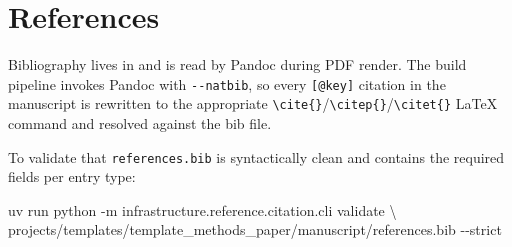 \documentclass[
  english,
]{article}
\newenvironment{Shaded}{}{}
\newcommand{\AttributeTok}[1]{\textcolor[rgb]{0.49,0.56,0.16}{#1}}
\newcommand{\DataTypeTok}[1]{\textcolor[rgb]{0.56,0.13,0.00}{#1}}
\newcommand{\ExtensionTok}[1]{#1}
\newcommand{\NormalTok}[1]{#1}
\begin{document}
\newpage

\section{References}\label{sec:references}

Bibliography lives in
\href{references.bib}{} and is read by
Pandoc during PDF render. The build pipeline invokes Pandoc with
\texttt{-\/-natbib}, so every \texttt{{[}@key{]}} citation in the
manuscript is rewritten to the appropriate
\texttt{\textbackslash{}cite\{\}}/\texttt{\textbackslash{}citep\{\}}/\texttt{\textbackslash{}citet\{\}}
LaTeX command and resolved against the bib file.

To validate that \texttt{references.bib} is syntactically clean and
contains the required fields per entry type:

\begin{Shaded}
\begin{Highlighting}[]
\ExtensionTok{uv}\NormalTok{ run python }\AttributeTok{{-}m}\NormalTok{ infrastructure.reference.citation.cli validate }\DataTypeTok{\textbackslash{}}
\NormalTok{    projects/templates/template\_methods\_paper/manuscript/references.bib }\AttributeTok{{-}{-}strict}
\end{Highlighting}
\end{Shaded}




\clearpage


\end{document}
